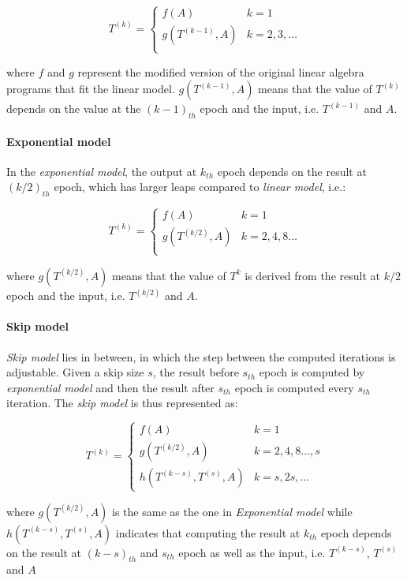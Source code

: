 \[T^{(k)}=
\begin{cases}
f(A)& k=1\\
g(T^{(k-1)}, A) & k=2,3,\dots\\
\end{cases}
\]

where $f$ and $g$ represent the modified version of the original linear algebra programs that fit the linear model. $g(T^{(k-1)}, A)$ means that the value of $T^{(k)}$ depends on the value at the $(k-1)_{th}$ epoch and the input, i.e.  $T^{(k-1)}$ and $A$.

\paragraph{Exponential model} In the {\em exponential model}, the output at $k_{th}$ epoch depends on the result at $(k/2)_{th}$ epoch, which has larger leaps compared to {\em linear model}, i.e.:

\[
T^{(k)}=
\begin{cases}
f(A)& k=1\\
g(T^{(k/2)}, A) & k=2,4,8\dots\\
\end{cases}
\]

where $g(T^{(k/2)}, A)$ means that the value of $T^{k}$ is derived from the result at $k/2$ epoch and the input, i.e. $T^{(k/2)}$ and $A$.

\paragraph{Skip model} {\em Skip model} lies in between, in which the step between the computed iterations is adjustable. Given a skip size $s$, the result before $s_{th}$ epoch is computed by {\em exponential model} and then the result after $s_{th}$ epoch is computed every $s_{th}$ iteration. The {\em skip model} is thus represented as:

\[
T^{(k)}=
\begin{cases}
f(A)& k=1\\
g(T^{(k/2)}, A) & k=2,4,8\dots,s\\
h(T^{(k-s)}, T^{(s)}, A) & k=s, 2s,\dots
\end{cases}
\]

where $g(T^{(k/2)}, A)$ is the same as the one in {\em Exponential model} while $h(T^{(k-s)}, T^{(s)}, A)$ indicates that computing the result at $k_{th}$ epoch depends on the result at $(k-s)_{th}$ and $s_{th}$ epoch as well as the input, i.e. $T^{(k-s)}$, $T^{(s)}$ and $A$

